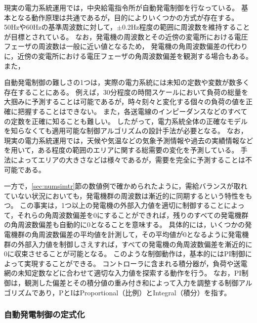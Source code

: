 \documentclass[tombow,dvipdfmx]{corona-a5-1.1}
\begin{document}
現実の電力系統運用では，中央給電指令所が自動発電制御を行なっている。
基本となる動作原理は共通であるが，目的によりいくつかの方式が存在する。
50Hzや60Hzの基準周波数に対して，$\pm$0.2Hz程度の範囲に周波数を維持することが目標とされている。
なお，発電機の周波数とその近傍の変電所における電圧フェーザの周波数は一般に近い値となるため，
発電機の角周波数偏差の代わりに，近傍の変電所における電圧フェーザの角周波数偏差を観測する場合もある。
また，


自動発電制御の難しさの1つは，実際の電力系統には未知の定数や変数が数多く存在することにある。
例えば，30分程度の時間スケールにおいて負荷の総量を大掴みに予測することは可能であるが，時々刻々と変化する個々の負荷の値を正確に把握することはできない。
また，各送電線のインピーダンスなどのすべての定数を正確に知ることも難しい。
したがって，電力系統全体の正確なモデルを知らなくても適用可能な制御アルゴリズムの設計手法が必要となる。
なお，現実の電力系統運用では，天候や気温などの気象予測情報や過去の実績情報などを用いて，ある程度の範囲のエリアに関する総需要の変化を予測している。
手法によってエリアの大きさなどは様々であるが，需要を完全に予測することは不可能である。


一方で，\ref{sec:numsimtr}節の数値例で確かめられたように，需給バランスが取れていない状況においても，発電機群の周波数は漸近的に同期するという特性をもつ。
この事実は，1つ以上の発電機の外部入力値を適切に制御することによって，それらの角周波数偏差を0にすることができれば，残りのすべての発電機群の角周波数偏差も自動的に0となることを意味する。
具体的には，いくつかの発電機群の角周波数偏差の平均値を計測して，その平均値が0となるように発電機群の外部入力値を制御しさえすれば，すべての発電機の角周波数偏差を漸近的に0に収束させることが可能となる。
このような制御動作は，基本的にはPI制御によって実現することができる。
コントローラに含まれる積分器が，負荷や送電網の未知定数などに合わせて適切な入力値を探索する動作を行う。
なお，PI制御は，観測した偏差とその積分値の重み付き和によって入力を調整する制御アルゴリズムであり，PとIはProportional（比例）とIntegral（積分）を指す。


\smallskip
\subsubsection{自動発電制御の定式化}
\end{document}

